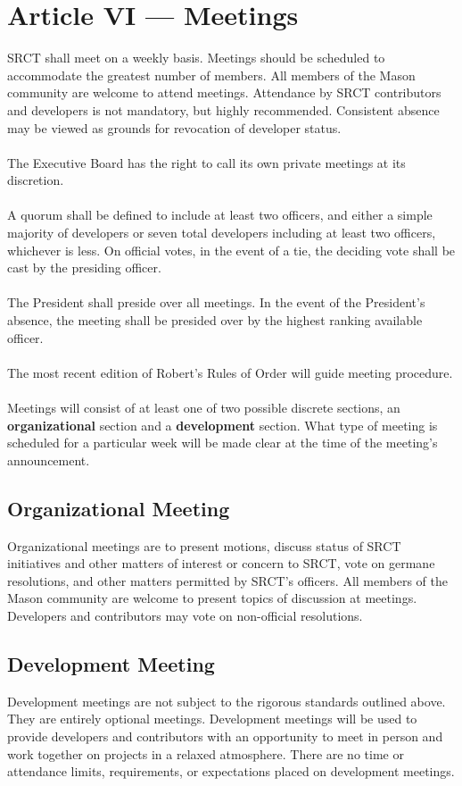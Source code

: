 \documentclass{article}
\begin{document}
  \section{Article VI --- Meetings}
  SRCT shall meet on a weekly basis. Meetings should be scheduled to 
  accommodate the greatest number of members. All members of the Mason
  community are welcome to attend meetings. Attendance by SRCT 
  contributors and developers is not mandatory, but highly recommended. 
  Consistent absence may be viewed as grounds for revocation of 
  developer status.
  \\ \\
  The Executive Board has the right to call its own private meetings at
  its discretion.
  \\ \\
  A quorum shall be defined to include at least two officers, and either 
  a simple majority of developers or seven total developers including at
  least two officers, whichever is less. On official votes, in the event
  of a tie, the deciding vote shall be cast by the presiding officer.
  \\ \\
  The President shall preside over all meetings. In the event of the 
  President's absence, the meeting shall be presided over by the highest
  ranking available officer.
  \\ \\
  The most recent edition of Robert's Rules of Order will guide meeting 
  procedure.
  \\ \\
  Meetings will consist of at least one of two possible discrete 
  sections, an \textbf{organizational} section and a 
  \textbf{development} section. What type of meeting is scheduled for a
  particular week will be made clear at the time of the meeting's 
  announcement.
  
  \subsection{Organizational Meeting}
  Organizational meetings are to present motions, discuss status of SRCT 
  initiatives and other matters of interest or concern to SRCT, vote on 
  germane resolutions, and other matters permitted by SRCT's officers. 
  All members of the Mason community are welcome to present topics of 
  discussion at meetings. Developers and contributors may vote on 
  non-official resolutions.
  
  \subsection{Development Meeting}
  Development meetings are not subject to the rigorous standards 
  outlined above. They are entirely optional meetings. Development 
  meetings will be used to provide developers and contributors with an 
  opportunity to meet in person and work together on projects in a 
  relaxed atmosphere. There are no time or attendance limits, 
  requirements, or expectations placed on development meetings.
  
\end{document}
